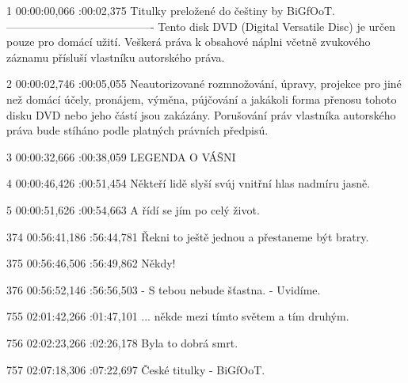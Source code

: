 \begin{subexam}
1
00:00:00,066 :00:02,375
Titulky preložené do češtiny by BiGfOoT.
----------------------------------------
Tento disk DVD (Digital Versatile Disc)
je určen pouze pro domácí užití.
Veškerá práva k obsahové náplni včetně
zvukového záznamu přísluší vlastníku
autorského práva.

2
00:00:02,746 :00:05,055
Neautorizované rozmnožování,
úpravy, projekce pro jiné než domácí
účely, pronájem, výměna, pújčování a
jakákoli forma přenosu tohoto disku
DVD nebo jeho částí jsou zakázány.
Porušování práv vlastníka autorského
práva bude stíháno podle platných
právních předpisú.

3
00:00:32,666 :00:38,059
LEGENDA O VÁŠNI

4
00:00:46,426 :00:51,454
Někteří lidě slyší svúj
vnitřní hlas nadmíru jasně.

5
00:00:51,626 :00:54,663
A řídí se jím po celý život.

374
00:56:41,186 :56:44,781
Řekni to ještě jednou
a přestaneme být bratry.

375
00:56:46,506 :56:49,862
Někdy!

376
00:56:52,146 :56:56,503
- S tebou nebude šťastna.
- Uvidíme.

755
02:01:42,266 :01:47,101
... někde mezi tímto světem
a tím druhým.

756
02:02:23,266 :02:26,178
Byla to dobrá smrt.

757
02:07:18,306 :07:22,697
České titulky - BiGfOoT.
\end{subexam}


